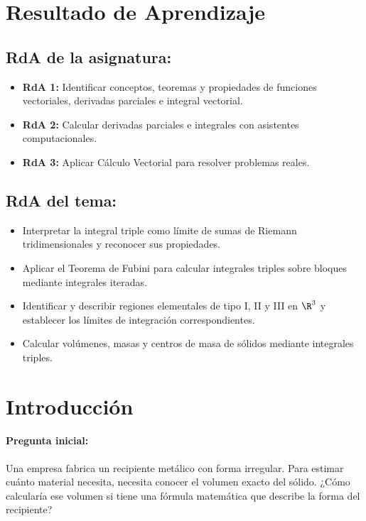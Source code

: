 \documentclass[a4,11pt]{aleph-notas}
\begin{document}
\encabezado

\section*{Resultado de Aprendizaje}

\subsection*{RdA de la asignatura:}
\begin{itemize}[leftmargin=*]
    \item \textbf{RdA 1:} Identificar conceptos, teoremas y propiedades de funciones vectoriales, derivadas parciales e integral vectorial.
    \item \textbf{RdA 2:} Calcular derivadas parciales e integrales con asistentes computacionales.
    \item \textbf{RdA 3:} Aplicar Cálculo Vectorial para resolver problemas reales.
\end{itemize}

\subsection*{RdA del tema:}
\begin{itemize}[leftmargin=*]
    \item Interpretar la integral triple como límite de sumas de Riemann tridimensionales y reconocer sus propiedades.
    \item Aplicar el Teorema de Fubini para calcular integrales triples sobre bloques mediante integrales iteradas.
    \item Identificar y describir regiones elementales de tipo I, II y III en $\R^3$ y establecer los límites de integración correspondientes.
    \item Calcular volúmenes, masas y centros de masa de sólidos mediante integrales triples.
\end{itemize}

\section*{Introducción}

\paragraph{Pregunta inicial:}
Una empresa fabrica un recipiente metálico con forma irregular. Para estimar cuánto material necesita, necesita conocer el volumen exacto del sólido. ¿Cómo calcularía ese volumen si tiene una fórmula matemática que describe la forma del recipiente?
\end{document}
